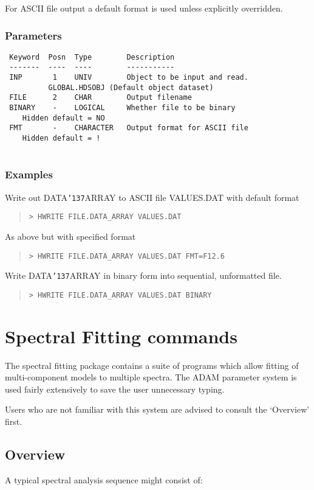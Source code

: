 \documentclass{book}
\renewcommand{\_}{{\tt\char'137}}     %
\begin{document}
For ASCII file output a default format is used unless explicitly
overridden.
 
\subsection{Parameters}
\begin{verbatim}
 Keyword  Posn  Type        Description
 -------  ----  ----        -----------
 INP       1    UNIV        Object to be input and read.
          GLOBAL.HDSOBJ (Default object dataset)
 FILE      2    CHAR        Output filename
 BINARY    -    LOGICAL     Whether file to be binary
    Hidden default = NO
 FMT       -    CHARACTER   Output format for ASCII file
    Hidden default = !
 
\end{verbatim}\subsection{Examples}
Write out DATA\_ARRAY to ASCII file VALUES.DAT with default format
\begin{quote}\begin{verbatim}
> HWRITE FILE.DATA_ARRAY VALUES.DAT
\end{verbatim}\end{quote}
As above but with specified format
\begin{quote}\begin{verbatim}
> HWRITE FILE.DATA_ARRAY VALUES.DAT FMT=F12.6
\end{verbatim}\end{quote}
Write DATA\_ARRAY in binary form into sequential, unformatted file.
\begin{quote}\begin{verbatim}
> HWRITE FILE.DATA_ARRAY VALUES.DAT BINARY
\end{verbatim}\end{quote}
\chapter{Spectral Fitting commands}
The spectral fitting package contains a suite of programs
which allow fitting of multi-component models to multiple spectra.
The ADAM parameter system is used fairly extensively to save the
user unnecessary typing.
 
Users who are not familiar with this system are advised to consult
the `Overview' first.
 
\section{Overview}
A typical spectral analysis sequence might consist of:
 
\end{document}
